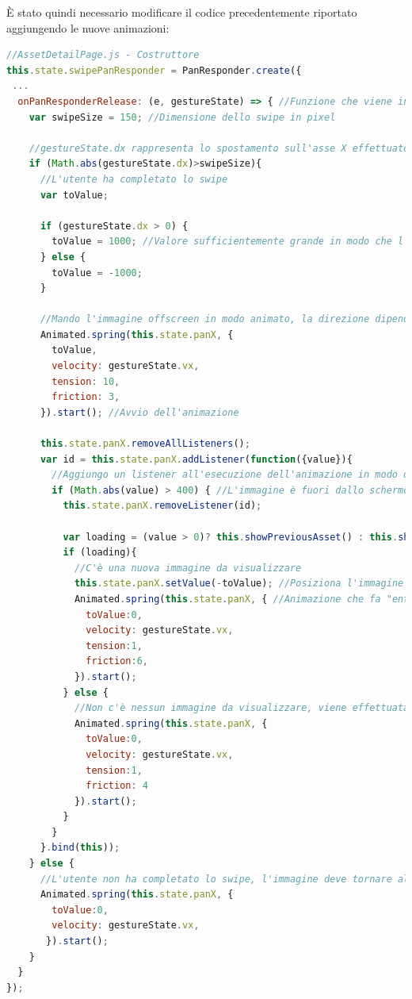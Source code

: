 \`E stato quindi necessario modificare il codice precedentemente riportato aggiungendo le nuove animazioni:
\begin{lstlisting}[language=JavaScript, caption=AssetDetailPage - Animazione dello swipe]
//AssetDetailPage.js - Costruttore
this.state.swipePanResponder = PanResponder.create({
 ...
  onPanResponderRelease: (e, gestureState) => { //Funzione che viene invocata quando l'utente termina la gesture
    var swipeSize = 150; //Dimensione dello swipe in pixel
    
    //gestureState.dx rappresenta lo spostamento sull'asse X effettuato dall'utente
    if (Math.abs(gestureState.dx)>swipeSize){
      //L'utente ha completato lo swipe
      var toValue;
      
      if (gestureState.dx > 0) {
        toValue = 1000; //Valore sufficientemente grande in modo che l'immagine venga renderizzata fuori dallo schermo
      } else {
        toValue = -1000;
      }
     
      //Mando l'immagine offscreen in modo animato, la direzione dipende dalla direzione della gesture (segno di gestureState.dx)
      Animated.spring(this.state.panX, {
        toValue,
        velocity: gestureState.vx,
        tension: 10,
        friction: 3,
      }).start(); //Avvio dell'animazione
      
      this.state.panX.removeAllListeners();
      var id = this.state.panX.addListener(function({value}){ 
      	//Aggiungo un listener all'esecuzione dell'animazione in modo di riuscire a capire quando l'immagine è finita fuori dallo schermo
        if (Math.abs(value) > 400) { //L'immagine è fuori dallo schermo
          this.state.panX.removeListener(id);
          
          var loading = (value > 0)? this.showPreviousAsset() : this.showNextAsset();
          if (loading){
            //C'è una nuova immagine da visualizzare
            this.state.panX.setValue(-toValue); //Posiziona l'immagine dalla parte opposta dello schermo
            Animated.spring(this.state.panX, { //Animazione che fa "entrare" la nuova immagine dalla parte opposta dello schermo
              toValue:0,
              velocity: gestureState.vx,
              tension:1,
              friction:6,
            }).start();
          } else {
          	//Non c'è nessun immagine da visualizzare, viene effettuata l'animazione che riporta l'immagine alla posizione iniziale
            Animated.spring(this.state.panX, {
              toValue:0,
              velocity: gestureState.vx,
              tension:1,
              friction: 4
            }).start();
          }
        }
      }.bind(this));
    } else {
      //L'utente non ha completato lo swipe, l'immagine deve tornare alla posizione iniziale in modo animato
      Animated.spring(this.state.panX, {
        toValue:0,
        velocity: gestureState.vx,
       }).start();
    }
  }
});
\end{lstlisting}

